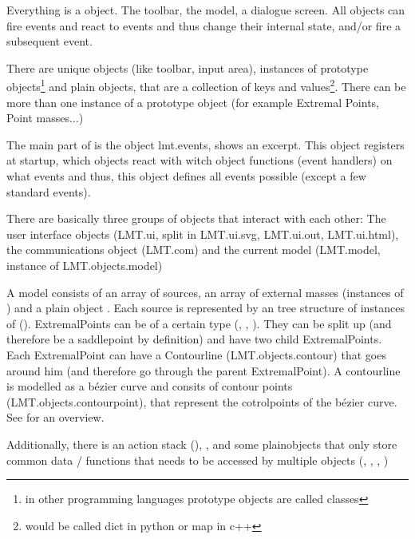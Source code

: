 Everything is a object. The toolbar, the model, a dialogue screen.
All objects can fire events and react to events and thus change their internal state, and/or fire a subsequent event.

There are unique objects (like toolbar, input area), instances of prototype objects\footnote{in other programming languages prototype objects are called classes} and plain objects, that are a collection of keys and values\footnote{would be called dict in python or map in c++}. There can be more than one instance of a prototype object (for example Extremal Points, Point masses...)

The main part of \spl is the object lmt.events,  shows an excerpt. This object registers at startup, which objects react with witch object functions (event handlers) on what events and thus, this object defines all events possible (except a few standard events).


There are basically three groups of objects that interact with each other: The user interface objects (LMT.ui, split in LMT.ui.svg, LMT.ui.out, LMT.ui.html), the communications object (LMT.com) and the current model (LMT.model, instance of LMT.objects.model)

A model consists of an array of sources, an array of external masses (instances of ) and a plain object .
Each source is represented by an tree structure of instances of  ().
ExtremalPoints can be of a certain type (, , ).
They can be split up (and therefore be a saddlepoint by definition) and have two child ExtremalPoints.
Each ExtremalPoint can have a Contourline (LMT.objects.contour) that goes around him (and therefore go through the parent ExtremalPoint).
A contourline is modelled as a bézier curve and consits of contour points (LMT.objects.contourpoint), that represent the cotrolpoints of the bézier curve. See  for an overview.

Additionally, there is an action stack (), , 
and some plainobjects that only store common data / functions that needs to be accessed by multiple objects (, , , )




